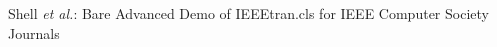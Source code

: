 \documentclass[10pt,journal,compsoc]{IEEEtran}
\begin{document}
% 
%

%
{Shell \MakeLowercase{\textit{et al.}}: Bare Advanced Demo of IEEEtran.cls for IEEE Computer Society Journals}
% 

\end{document}
